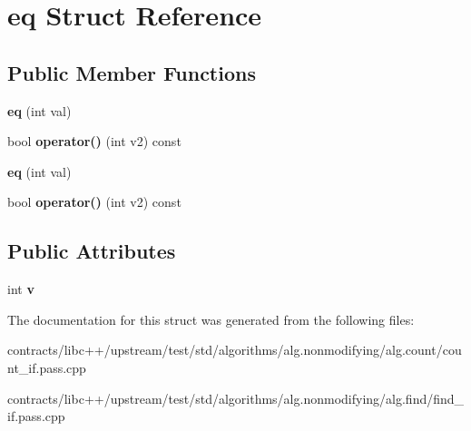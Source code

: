 \hypertarget{structeq}{}\section{eq Struct Reference}
\label{structeq}
\subsection*{Public Member Functions}
\begin{DoxyCompactItemize}
\item 
\mbox{\label{structeq_ab3b6a53c9987fdbffc8719889ad1a526}} 
{\bfseries eq} (int val)
\item 
\mbox{\label{structeq_ae0ec9da9a9a09acf87ac4d44fe79ca45}} 
bool {\bfseries operator()} (int v2) const
\item 
\mbox{\label{structeq_ab3b6a53c9987fdbffc8719889ad1a526}} 
{\bfseries eq} (int val)
\item 
\mbox{\label{structeq_ae0ec9da9a9a09acf87ac4d44fe79ca45}} 
bool {\bfseries operator()} (int v2) const
\end{DoxyCompactItemize}
\subsection*{Public Attributes}
\begin{DoxyCompactItemize}
\item 
\mbox{\label{structeq_aa3c103240b3638d3fcb3a053aec01482}} 
int {\bfseries v}
\end{DoxyCompactItemize}


The documentation for this struct was generated from the following files\+:\begin{DoxyCompactItemize}
\item 
contracts/libc++/upstream/test/std/algorithms/alg.\+nonmodifying/alg.\+count/count\+\_\+if.\+pass.\+cpp\item 
contracts/libc++/upstream/test/std/algorithms/alg.\+nonmodifying/alg.\+find/find\+\_\+if.\+pass.\+cpp\end{DoxyCompactItemize}

